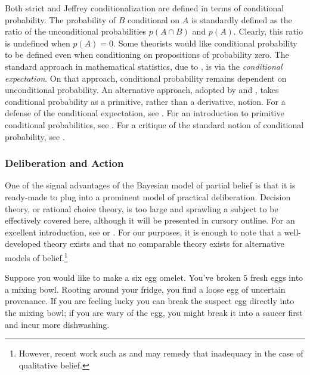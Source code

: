 Both strict and Jeffrey conditionalization are defined in terms of conditional
probability. The probability of $B$ conditional on $A$ is standardly defined as
the ratio of the unconditional probabilities $p(A\cap B)$ and $p(A)$. Clearly,
this ratio is undefined when $p(A)=0$. Some theorists would like conditional
probability to be defined even when conditioning on propositions of probability
zero. The standard approach in mathematical statistics, due to
\citet{kolmogorov1950foundations}, is via the {\em conditional expectation}. On
that approach, conditional probability remains dependent on unconditional
probability. An alternative approach, adopted by \citet{popper1955probability}
and \citet{renyi1955newsystem}, takes conditional probability as a primitive,
rather than a derivative, notion. For a defense of the conditional expectation,
see \citet{gyenis2017conditioning}. For an introduction to primitive conditional
probabilities, see \citet{easwaran2015primitive}. For a critique of the standard
notion of conditional probability, see \citet{hajek2003what}. 


\subsubsection{Deliberation and Action}

One of the signal advantages of the Bayesian model of partial belief is that it
is ready-made to plug into a prominent model of practical deliberation. Decision
theory, or rational choice theory, is too large and sprawling a subject to be
effectively covered here, although it will be presented in cursory outline. For
an excellent introduction, see \citet{sep-rationality-normative-utility} or
\citet{thoma2019decision}. For our purposes, it is enough to note that a
well-developed theory exists and that no comparable theory exists for
alternative models of belief.\footnote{However, recent work such as
\citet{lin2013foundations} and \citet{spohn2017knightian, spohn2019defeasible}
may remedy that inadequacy in the case of qualitative belief.}

Suppose you would like to make a six egg omelet. You've broken $5$ fresh eggs
into a mixing bowl. Rooting around your fridge, you find a loose egg of
uncertain provenance. If you are feeling lucky you can break the suspect egg
directly into the mixing bowl; if you are wary of the egg, you might break it
into a saucer first and incur more dishwashing.

